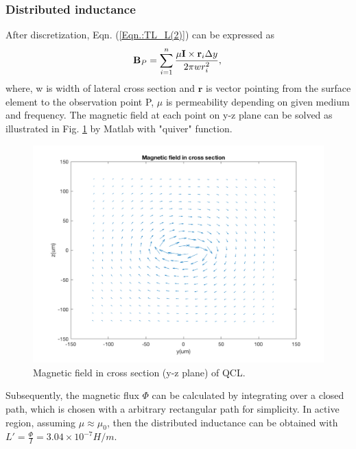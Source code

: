 \documentclass[11pt,final]{scrbook}
\begin{document}
\subsubsection{Distributed inductance}
After discretization, Eqn. (\ref{Eqn.:TL_L(2)}) can be expressed as
\begin{equation}
 \textbf{B}_{P}=\sum _{ i=1 }^{ n }{  \frac { \mu \textbf{I}\times { \textbf{r} }_{ i } \Delta y }{ 2\pi w{ r }_{ i}^{ 2 } }  }, \\
 \label{eq. TL_L}
 \end{equation}
 where, w is width of lateral cross section and $\textbf{r}$ is vector pointing from the surface element to the observation point P, $\mu$ is permeability depending on given medium and frequency. The magnetic field at each point on y-z plane can be solved as illustrated in Fig. \ref{fig:TL_L} by Matlab with "quiver" function. 

\begin{figure}[htbp]
\begin{center}
\includegraphics[scale=0.3]{images/TL_L.pdf}
\caption{Magnetic field in cross section (y-z plane) of QCL.}
\label{fig:TL_L}
\end{center}
\end{figure}
%
% 
Subsequently, the magnetic flux $\Phi$ can be calculated by integrating over a closed path, which is chosen with a arbitrary rectangular path for simplicity.  In active region, assuming $\mu\approx \mu_{0}$, then the distributed inductance can be obtained with $L'=\frac{\Phi }{I}=3.04\times 10^{-7} H/m$.
%
 
\end{document}
